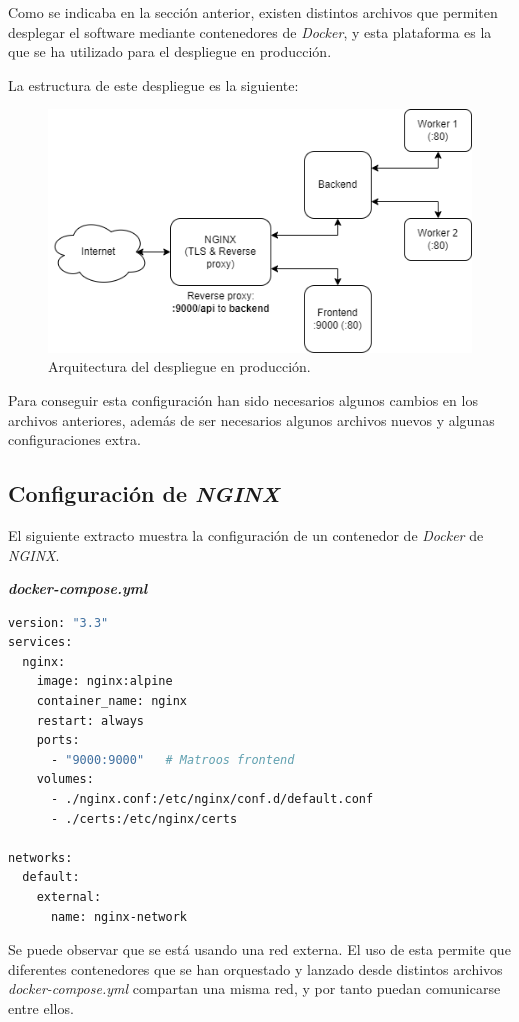 Como se indicaba en la sección anterior, existen distintos archivos que permiten desplegar el software mediante contenedores de \textit{Docker}, y esta plataforma es la que se ha utilizado para el despliegue en producción.

La estructura de este despliegue es la siguiente:

\begin{figure}[H]
	\centering
	\includegraphics[width=1\textwidth]{img/production.png}
	\caption{Arquitectura del despliegue en producción.}
\end{figure}

Para conseguir esta configuración han sido necesarios algunos cambios en los archivos anteriores, además de ser necesarios algunos archivos nuevos y algunas configuraciones extra.

\subsection{Configuración de \textit{NGINX}}

El siguiente extracto muestra la configuración de un contenedor de \textit{Docker} de \textit{NGINX}.

\textbf{\textit{docker-compose.yml}}

\begin{lstlisting}[language=sh]
version: "3.3"
services:
  nginx:
    image: nginx:alpine
    container_name: nginx
    restart: always
    ports:
      - "9000:9000"   # Matroos frontend
    volumes:
      - ./nginx.conf:/etc/nginx/conf.d/default.conf
      - ./certs:/etc/nginx/certs

networks:
  default:
    external:
      name: nginx-network
\end{lstlisting}

Se puede observar que se está usando una red externa. El uso de esta permite que diferentes contenedores que se han orquestado y lanzado desde distintos archivos \textit{docker-compose.yml} compartan una misma red, y por tanto puedan comunicarse entre ellos.

